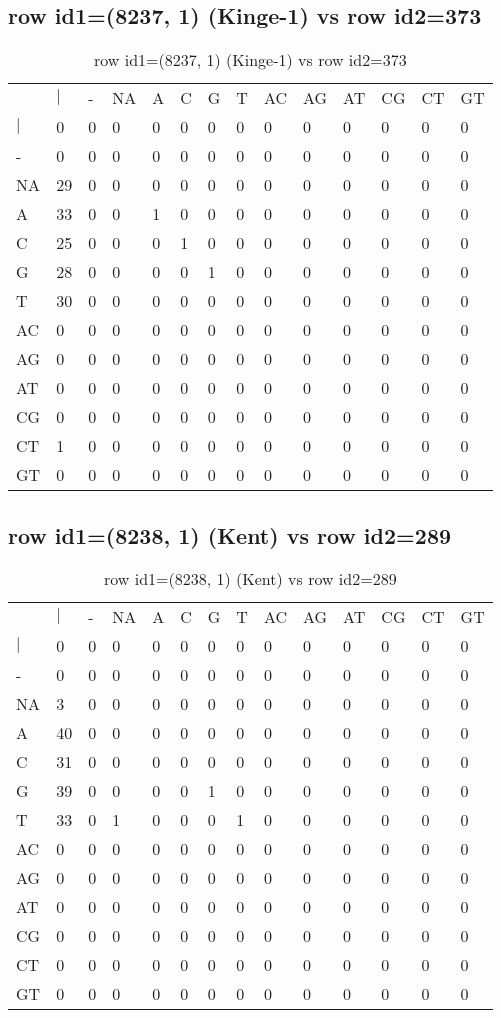 \subsection{row id1=(8237, 1) (Kinge-1) vs row id2=373}
\begin{center}
\begin{longtable}{|l|l|l|l|l|l|l|l|l|l|l|l|l|l|}
\caption{row id1=(8237, 1) (Kinge-1) vs row id2=373} \label{table_dm170}\\
\hline
\\
\hline
&$|$&-&NA&A&C&G&T&AC&AG&AT&CG&CT&GT\\
$|$&0&0&0&0&0&0&0&0&0&0&0&0&0\\
-&0&0&0&0&0&0&0&0&0&0&0&0&0\\
NA&29&0&0&0&0&0&0&0&0&0&0&0&0\\
A&33&0&0&1&0&0&0&0&0&0&0&0&0\\
C&25&0&0&0&1&0&0&0&0&0&0&0&0\\
G&28&0&0&0&0&1&0&0&0&0&0&0&0\\
T&30&0&0&0&0&0&0&0&0&0&0&0&0\\
AC&0&0&0&0&0&0&0&0&0&0&0&0&0\\
AG&0&0&0&0&0&0&0&0&0&0&0&0&0\\
AT&0&0&0&0&0&0&0&0&0&0&0&0&0\\
CG&0&0&0&0&0&0&0&0&0&0&0&0&0\\
CT&1&0&0&0&0&0&0&0&0&0&0&0&0\\
GT&0&0&0&0&0&0&0&0&0&0&0&0&0\\
\hline
\end{longtable}
\end{center}

\subsection{row id1=(8238, 1) (Kent) vs row id2=289}
\begin{center}
\begin{longtable}{|l|l|l|l|l|l|l|l|l|l|l|l|l|l|}
\caption{row id1=(8238, 1) (Kent) vs row id2=289} \label{table_dm172}\\
\hline
\\
\hline
&$|$&-&NA&A&C&G&T&AC&AG&AT&CG&CT&GT\\
$|$&0&0&0&0&0&0&0&0&0&0&0&0&0\\
-&0&0&0&0&0&0&0&0&0&0&0&0&0\\
NA&3&0&0&0&0&0&0&0&0&0&0&0&0\\
A&40&0&0&0&0&0&0&0&0&0&0&0&0\\
C&31&0&0&0&0&0&0&0&0&0&0&0&0\\
G&39&0&0&0&0&1&0&0&0&0&0&0&0\\
T&33&0&1&0&0&0&1&0&0&0&0&0&0\\
AC&0&0&0&0&0&0&0&0&0&0&0&0&0\\
AG&0&0&0&0&0&0&0&0&0&0&0&0&0\\
AT&0&0&0&0&0&0&0&0&0&0&0&0&0\\
CG&0&0&0&0&0&0&0&0&0&0&0&0&0\\
CT&0&0&0&0&0&0&0&0&0&0&0&0&0\\
GT&0&0&0&0&0&0&0&0&0&0&0&0&0\\
\hline
\end{longtable}
\end{center}

